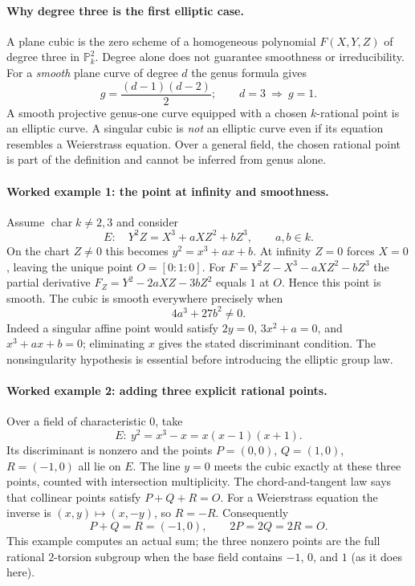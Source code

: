 \paragraph{Why degree three is the first elliptic case.}
A plane cubic is the zero scheme of a homogeneous polynomial
$F(X,Y,Z)$ of degree three in $\mathbb P^2_k$.  Degree alone does
not guarantee smoothness or irreducibility.  For a \emph{smooth}
plane curve of degree $d$ the genus formula gives
\[
 g=\frac{(d-1)(d-2)}{2};\qquad d=3\ \Longrightarrow\ g=1.
\]
A smooth projective genus-one curve equipped with a chosen
$k$-rational point is an elliptic curve.  A singular cubic is
\emph{not} an elliptic curve even if its equation resembles a
Weierstrass equation.  Over a general field, the chosen rational
point is part of the definition and cannot be inferred from genus
alone.

\paragraph{Worked example 1: the point at infinity and smoothness.}
Assume $\operatorname{char}k\ne2,3$ and consider
\[
 E:\quad Y^2Z=X^3+aXZ^2+bZ^3,
 \qquad a,b\in k.
\]
On the chart $Z\ne0$ this becomes $y^2=x^3+ax+b$.
At infinity $Z=0$ forces $X=0$, leaving the unique point
$O=[0:1:0]$.  For
$F=Y^2Z-X^3-aXZ^2-bZ^3$ the partial derivative
$F_Z=Y^2-2aXZ-3bZ^2$ equals $1$ at $O$.  Hence this point
is smooth.  The cubic is smooth everywhere precisely when
\[
 4a^3+27b^2\ne0.
\]
Indeed a singular affine point would satisfy
$2y=0$, $3x^2+a=0$, and $x^3+ax+b=0$; eliminating $x$
gives the stated discriminant condition.  The nonsingularity
hypothesis is essential before introducing the elliptic group law.

\paragraph{Worked example 2: adding three explicit rational points.}
Over a field of characteristic $0$, take
\[
 E:\ y^2=x^3-x=x(x-1)(x+1).
\]
Its discriminant is nonzero and the points
$P=(0,0)$, $Q=(1,0)$, $R=(-1,0)$ all lie on $E$.
The line $y=0$ meets the cubic exactly at these three points,
counted with intersection multiplicity.  The chord-and-tangent
law says that collinear points satisfy $P+Q+R=O$.
For a Weierstrass equation the inverse is $(x,y)\mapsto(x,-y)$,
so $R=-R$.  Consequently
\[
 P+Q=R=(-1,0),\qquad 2P=2Q=2R=O.
\]
This example computes an actual sum; the three nonzero points
are the full rational $2$-torsion subgroup when the base field
contains $-1$, $0$, and $1$ (as it does here).

